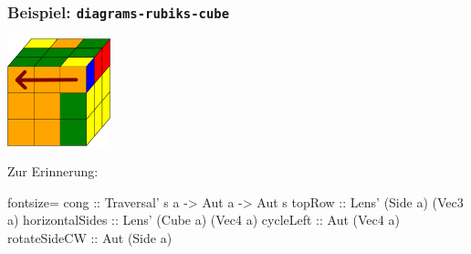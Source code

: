 \documentclass{beamer}
\begin{document}
\begin{frame}[fragile]
  \frametitle{Beispiel: \texttt{diagrams-rubiks-cube}}
  \begin{minipage}{0.3 \linewidth}
    \includegraphics[width=3cm]{images/rubiks-cube.png}
  \end{minipage}
  \begin{minipage}{0.68 \linewidth}
  \end{minipage}

  \vspace{0.5cm}
  \begin{minipage}{0.7 \linewidth}
    \begin{mdframed}[backgroundcolor=yellow]
      Zur Erinnerung:
      \begin{haskellcode*}{fontsize=\footnotesize}
cong :: Traversal' s a -> Aut a -> Aut s
topRow :: Lens' (Side a) (Vec3 a)
horizontalSides :: Lens' (Cube a) (Vec4 a)
cycleLeft :: Aut (Vec4 a)
rotateSideCW :: Aut (Side a)
      \end{haskellcode*}
    \end{mdframed}
  \end{minipage}
\end{frame}
\end{document}

